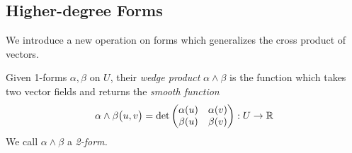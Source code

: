 	



\clearpage

\subsection{Higher-degree Forms}\label{sec:kform}

We introduce a new operation on forms which generalizes the cross product of vectors.

\begin{defn}{}{}
Given 1-forms $\alpha,\beta$ on $U$, their \emph{wedge product} $\alpha\wedge\beta$ is the function which takes two vector fields and returns the \emph{smooth function}
\[\alpha\wedge\beta\bigl(u,v\bigr)=\det\begin{pmatrix}
\alpha(u)&\alpha(v)\\
\beta(u)&\beta(v)
\end{pmatrix}:U\to\mathbb{R}\]
We call $\alpha\wedge\beta$ a \emph{2-form.}
\end{defn}

